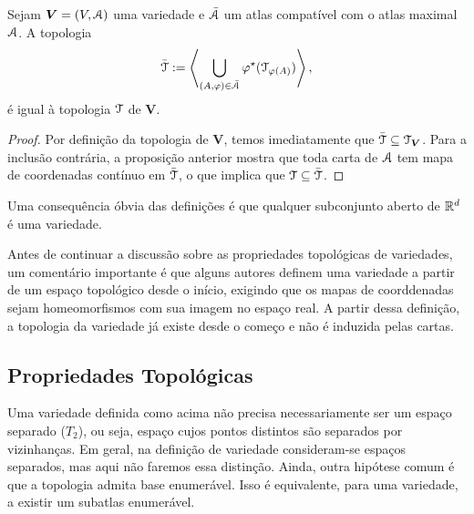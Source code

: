 \begin{prop}
Sejam $\bm V=(V,\mathcal{A})$ uma variedade e $\bar{\mathcal{A}}$ um atlas compatível com o atlas maximal $\mathcal{A}$. A topologia
	\begin{equation*}
	\bar{\mathcal{T}} := \left\langle \bigcup_{(A,\varphi) \in \bar{\mathcal{A}}} \varphi^\star(\mathcal{T}_{\varphi(A)}) \right\rangle,
	\end{equation*}
é igual à topologia $\mathcal{T}$ de $\bm V$.
\end{prop}
\begin{proof}
Por definição da topologia de $\bm V$, temos imediatamente que $\bar{\mathcal{T}} \subseteq \mathcal{T}_{\bm V}$. Para a inclusão contrária, a proposição anterior mostra que toda carta de $\mathcal{A}$ tem mapa de coordenadas contínuo em $\bar{\mathcal{T}}$, o que implica que $\mathcal{T} \subseteq \bar{\mathcal{T}}$.
\end{proof}

Uma consequência óbvia das definições é que qualquer subconjunto aberto de $\mathbb{R}^d$ é uma variedade.

Antes de continuar a discussão sobre as propriedades topológicas de variedades, um comentário importante é que alguns autores definem uma variedade a partir de um espaço topológico desde o início, exigindo que os mapas de coorddenadas sejam homeomorfismos com sua imagem no espaço real. A partir dessa definição, a topologia da variedade já existe desde o começo e não é induzida pelas cartas.

\subsection{Propriedades Topológicas}

Uma variedade definida como acima não precisa necessariamente ser um espaço separado ($T_2$), ou seja, espaço cujos pontos distintos são separados por vizinhanças. Em geral, na definição de variedade consideram-se espaços separados, mas aqui não faremos essa distinção. Ainda, outra hipótese comum é que a topologia admita base enumerável. Isso é equivalente, para uma variedade, a existir um subatlas enumerável.

